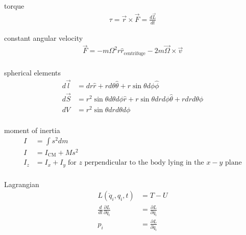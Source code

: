 \documentclass[avery5388, frame, grid]{flashcards}
\begin{document}
\begin{flashcard}{torque}
  {
    \begin{align*}
      \tau = \vec{r} \times \vec{F} = \frac{d \vec{L}}{dt}
    \end{align*}
  }
\end{flashcard}

\begin{flashcard}{constant angular velocity}
  {
    \begin{align*}
      \vec{F} = - m \Omega^{2} r \hat{r}_{\textrm{centrifuge}} - 2 m \vec{\Omega} \times \vec{v}\\
    \end{align*}
  }
\end{flashcard}

\begin{flashcard}{spherical elements}
  {
    \begin{align*}
      d\vec{l} &= dr \hat{r} + r d\theta \hat{\theta} + r \sin\theta d\phi \hat{\phi}\\
      d\vec{S} &= r^{2}\sin\theta d\theta d\phi \hat{r} + r \sin\theta dr d\phi \hat{\theta} + r dr d\theta \hat{\phi}\\
      dV &= r^{2}\sin\theta dr d\theta d\phi\\
    \end{align*}
  }
\end{flashcard}

\begin{flashcard}{moment of inertia}
  {
    \begin{align*}
      I &= \int{s^{2} dm}\\
      I &= I_{\textrm{CM}} + M s^{2}\\
      I_{z} &= I_{x} + I_{y} \; \textrm{for $z$ perpendicular to the body lying in the $x-y$ plane}\\
    \end{align*}
  }
\end{flashcard}

\begin{flashcard}{Lagrangian}
  {
    \begin{align*}
        L(\dot{q}_{i}, q_{i}, t) &= T - U\\
        \frac{d}{dt} \frac{\partial L}{\partial \dot{q}_{i}} &= \frac{\partial L}{\partial q_{i}}\\
        p_{i} &= \frac{\partial L}{\partial \dot{q}_{i}}\\
    \end{align*}
  }
\end{flashcard}
\end{document}
